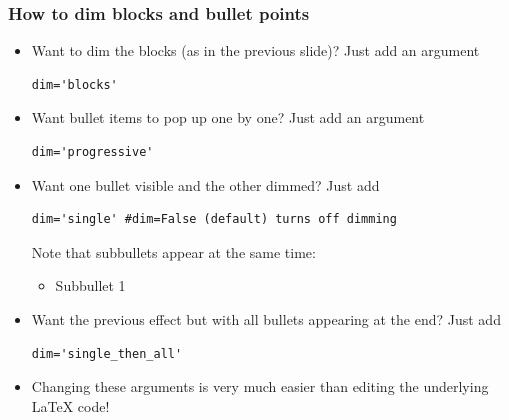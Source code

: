 \documentclass{beamer}
\begin{document}
\begin{frame}[fragile]
\frametitle{How to dim blocks and bullet points}

\begin{block}

\begin{itemize}
\item<2-> Want to dim the blocks (as in the previous slide)? Just add an argument\begin{Verbatim}[fontsize=\footnotesize,tabsize=4,baselinestretch=0.85,fontfamily=tt,xleftmargin=7mm]
dim='blocks'
\end{Verbatim}

\item<3-> Want bullet items to pop up one by one? Just add an argument\begin{Verbatim}[fontsize=\footnotesize,tabsize=4,baselinestretch=0.85,fontfamily=tt,xleftmargin=7mm]
dim='progressive'
\end{Verbatim}

\item<4-> Want one bullet visible and the other dimmed? Just add\begin{Verbatim}[fontsize=\footnotesize,tabsize=4,baselinestretch=0.85,fontfamily=tt,xleftmargin=7mm]
dim='single' #dim=False (default) turns off dimming
\end{Verbatim}
Note that subbullets appear at the same time:
\begin{itemize}
\item<4-> Subbullet 1
\end{itemize}
\item<5-> Want the previous effect but with all bullets appearing at the end? Just add\begin{Verbatim}[fontsize=\footnotesize,tabsize=4,baselinestretch=0.85,fontfamily=tt,xleftmargin=7mm]
dim='single_then_all'
\end{Verbatim}

\item<6-> Changing these arguments is very much easier than editing the underlying \LaTeX{} code!
\end{itemize}

\end{block}

\end{frame}
\end{document}
